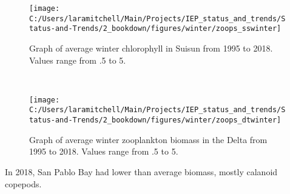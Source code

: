 \documentclass[
]{book}
\begin{document}
\begin{panel-grid}
\begin{columns-nocenter}
\begin{column40}
\end{column40}

\begin{column800}

\begin{expand}

\begin{figure}
\texttt{[image: C:/Users/laramitchell/Main/Projects/IEP\_status\_and\_trends/Status-and-Trends/2\_bookdown/figures/winter/zoops\_sswinter]} \caption{Graph of average winter chlorophyll in Suisun from 1995 to 2018. Values range from .5 to 5.}\label{fig:unnamed-chunk-166}
\end{figure}

\end{expand}

\end{column800}

\begin{column40}

~

\end{column40}

\begin{column800}

\begin{expand}

\begin{figure}
\texttt{[image: C:/Users/laramitchell/Main/Projects/IEP\_status\_and\_trends/Status-and-Trends/2\_bookdown/figures/winter/zoops\_dtwinter]} \caption{Graph of average winter zooplankton biomass in the Delta from 1995 to 2018. Values range from .5 to 5.}\label{fig:unnamed-chunk-167}
\end{figure}

\end{expand}

\end{column800}

\end{columns-nocenter}

\begin{columns-nocenter}

\begin{column800}

In 2018, San Pablo Bay had lower than average biomass, mostly calanoid copepods.

\end{column800}

\begin{column40}


\end{column40}
\end{columns-nocenter}
\end{panel-grid}
\end{document}
